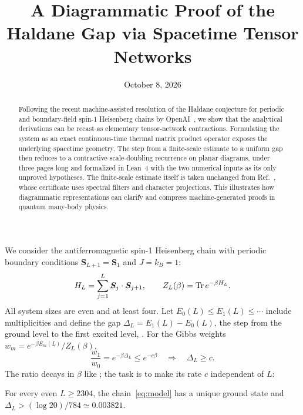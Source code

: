 \documentclass[aps,prl,reprint,amsmath,amssymb,nofootinbib,raggedbottom]{revtex4-2}
\begin{document}
\title{A Diagrammatic Proof of the Haldane Gap via Spacetime Tensor Networks}
\date{October 8, 2026}
\begin{abstract}
Following the recent machine-assisted resolution of the Haldane conjecture for periodic and boundary-field spin-1 Heisenberg chains by OpenAI~\cite{source,boundary}, we show that the analytical derivations can be recast as elementary tensor-network contractions.
Formulating the system as an exact continuous-time thermal matrix product operator exposes the underlying spacetime geometry.
The step from a finite-scale estimate to a uniform gap then reduces to a contractive scale-doubling recurrence on planar diagrams, under three pages long and formalized in Lean~4 with the two numerical inputs as its only unproved hypotheses.
The finite-scale estimate itself is taken unchanged from Ref.~\cite{source}, whose certificate uses spectral filters and character projections.
This illustrates how diagrammatic representations can clarify and compress machine-generated proofs in quantum many-body physics.
\end{abstract}
\maketitle
\setlength{\abovedisplayskip}{5pt plus 2pt minus 1pt}
\setlength{\belowdisplayskip}{5pt plus 2pt minus 1pt}

We consider the antiferromagnetic spin-1 Heisenberg chain with periodic
boundary conditions $\bm S_{L+1}=\bm S_1$ and $J=k_B=1$:
\begin{equation}
 H_L=\sum_{j=1}^L\bm S_j\cdot\bm S_{j+1},\qquad
 Z_L(\beta)=\operatorname{Tr} e^{-\beta H_L}.
 \label{eq:model}
\end{equation}
All system sizes are even and at least four. Let
$E_0(L)\le E_1(L)\le\cdots$ include multiplicities and define the gap
$\Delta_L=E_1(L)-E_0(L)$, the step from the ground level to the first
excited level, \levels. For the Gibbs weights
$w_m=e^{-\beta E_m(L)}/Z_L(\beta)$,
\begin{equation}
 \frac{w_1}{w_0}=e^{-\beta\Delta_L}\le e^{-c\beta}
 \quad\Longrightarrow\quad \Delta_L\ge c.
 \label{eq:target}
\end{equation}
The ratio decays in $\beta$ like \decayglyph; the task is to make its
rate $c$ independent of $L$:
\begin{theorem}\label{thm:gap}
For every even $L\ge2304$, the chain~\eqref{eq:model} has a unique ground
state and $\Delta_L>(\log20)/784\simeq0.003821$.
\end{theorem}
\end{document}
